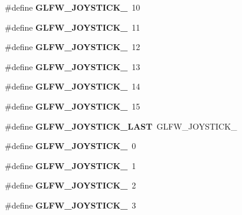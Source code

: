 \begin{DoxyCompactItemize}
\#define {\bfseries G\+L\+F\+W\+\_\+\+J\+O\+Y\+S\+T\+I\+C\+K\+\_}~10
\item 
\mbox{\label{group__joysticks_gab91bbf5b7ca6be8d3ac5c4d89ff48ac7}} 
\#define {\bfseries G\+L\+F\+W\+\_\+\+J\+O\+Y\+S\+T\+I\+C\+K\+\_}~11
\item 
\mbox{\label{group__joysticks_ga5c84fb4e49bf661d7d7c78eb4018c508}} 
\#define {\bfseries G\+L\+F\+W\+\_\+\+J\+O\+Y\+S\+T\+I\+C\+K\+\_}~12
\item 
\mbox{\label{group__joysticks_ga89540873278ae5a42b3e70d64164dc74}} 
\#define {\bfseries G\+L\+F\+W\+\_\+\+J\+O\+Y\+S\+T\+I\+C\+K\+\_}~13
\item 
\mbox{\label{group__joysticks_ga7b02ab70daf7a78bcc942d5d4cc1dcf9}} 
\#define {\bfseries G\+L\+F\+W\+\_\+\+J\+O\+Y\+S\+T\+I\+C\+K\+\_}~14
\item 
\mbox{\label{group__joysticks_ga453edeeabf350827646b6857df4f80ce}} 
\#define {\bfseries G\+L\+F\+W\+\_\+\+J\+O\+Y\+S\+T\+I\+C\+K\+\_}~15
\item 
\mbox{\label{group__joysticks_ga9ca13ebf24c331dd98df17d84a4b72c9}} 
\#define {\bfseries G\+L\+F\+W\+\_\+\+J\+O\+Y\+S\+T\+I\+C\+K\+\_\+\+L\+A\+ST}~G\+L\+F\+W\+\_\+\+J\+O\+Y\+S\+T\+I\+C\+K\+\_
\item 
\mbox{\label{group__joysticks_ga34a0443d059e9f22272cd4669073f73d}} 
\#define {\bfseries G\+L\+F\+W\+\_\+\+J\+O\+Y\+S\+T\+I\+C\+K\+\_}~0
\item 
\mbox{\label{group__joysticks_ga6eab65ec88e65e0850ef8413504cb50c}} 
\#define {\bfseries G\+L\+F\+W\+\_\+\+J\+O\+Y\+S\+T\+I\+C\+K\+\_}~1
\item 
\mbox{\label{group__joysticks_gae6f3eedfeb42424c2f5e3161efb0b654}} 
\#define {\bfseries G\+L\+F\+W\+\_\+\+J\+O\+Y\+S\+T\+I\+C\+K\+\_}~2
\item 
\mbox{\label{group__joysticks_ga97ddbcad02b7f48d74fad4ddb08fff59}} 
\#define {\bfseries G\+L\+F\+W\+\_\+\+J\+O\+Y\+S\+T\+I\+C\+K\+\_}~3

\end{DoxyCompactItemize}
